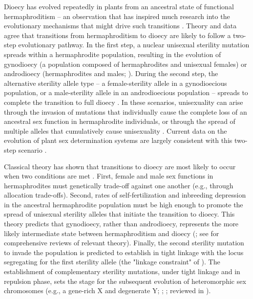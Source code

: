 \documentclass{article}
\begin{document}
Dioecy has evolved repeatedly in plants from an ancestral state of functional hermaphroditism -- an observation that has inspired much research into the evolutionary mechanisms that might drive such transitions \citep{Westergaard1958, SakaiWeller1999, Charlesworth2006, Bachtrog2014, Renner2014, GoldbergOtto2017, KaferPannell2017}. Theory and data agree that transitions from hermaphroditism to dioecy are likely to follow a two-step evolutionary pathway. In the first step, a nuclear unisexual sterility mutation spreads within a hermaphrodite population, resulting in the evolution of gynodioecy (a population composed of hermaphrodites and unisexual females) or androdioecy (hermaphrodites and males; \citealt{Charlesworth1978a, Charlesworth1978b}). During the second step, the alternative sterility allele type -- a female-sterility allele in a gynodioecious population, or a male-sterility allele in an androdioecious population -- spreads to complete the transition to full dioecy \citep{Westergaard1958, Charlesworth1978a, Charlesworth1978b, Charlesworth2006, Charlesworth2009, KaferPannell2017}. In these scenarios, unisexuality can arise through the invasion of mutations that individually cause the complete loss of an ancestral sex function in hermaphrodite individuals, or through the spread of multiple alleles that cumulatively cause unisexuality \citep{Charlesworth1978a, Charlesworth1978b, Morgan1992a, Morgan1992b, SegerEckhart1996, Charlesworth1999}. Current data on the evolution of plant sex determination systems are largely consistent with this two-step scenario \citep{Westergaard1958, Charlesworth2002, Charlesworth2006, Renner2014, Ashman2015}.

Classical theory has shown that transitions to dioecy are most likely to occur when two conditions are met \citep{Lewis1941, Lloyd1975, Lloyd1976, Charlesworth1978a, Morgan1992a, SegerEckhart1996}. First, female and male sex functions in hermaphrodites must genetically trade-off against one another (e.g., through allocation trade-offs). Second, rates of self-fertilization and inbreeding depression in the ancestral hermaphrodite population must be high enough to promote the spread of unisexual sterility alleles that initiate the transition to dioecy. This theory predicts that gynodioecy, rather than androdioecy, represents the more likely intermediate state between hermaphroditism and dioecy (\citealt{Lloyd1975, Charlesworth1978a, SegerEckhart1996, KaferPannell2017}; see \citealt{Charlesworth1999, Charlesworth2006} for comprehensive reviews of relevant theory). Finally, the second sterility mutation to invade the population is predicted to establish in tight linkage with the locus segregating for the first sterility allele (the "linkage constraint" of \citealt{Charlesworth1978a}). The establishment of complementary sterility mutations, under tight linkage and in repulsion phase, sets the stage for the subsequent evolution of heteromorphic sex chromosomes (e.g., a gene-rich X and degenerate Y; \citealt[pp.265--269]{Bull1983}; \citealt{Rice1987, Qiuetal2013}; reviewed in \citealt{Bachtrog2006,Charlesworth2002}). 
\end{document}

